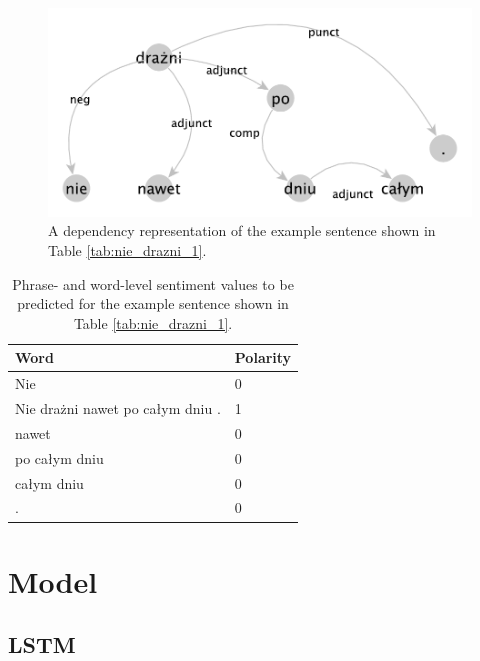 \documentclass[10pt, a4paper]{article}
\begin{document}
\begin{figure}
  \includegraphics[width=\linewidth]{imgs/nie_drazni.pdf}
  \caption{A dependency representation of the example sentence shown in Table \ref{tab:nie_drazni_1}.}
  \label{fig:dep_sent}
\end{figure}

\begin{table}[h]
 \begin{center}
\begin{tabular}{|l | l|}

\hline
 Word &	Polarity\\
      \hline
     Nie &	0\\
     \hline
Nie drażni nawet po całym dniu	 . & 1\\
\hline
nawet &	0\\
\hline
po całym dniu &	0\\
\hline
całym dniu &	0\\
\hline
.	& 0\\
      \hline
\end{tabular}
\caption{Phrase- and word-level sentiment values to be predicted for the example sentence shown in Table \ref{tab:nie_drazni_1}.}
\label{tab:nie_drazni_2}
 \end{center}
\end{table}






\section{Model} 


\subsection{LSTM}
\end{document}
